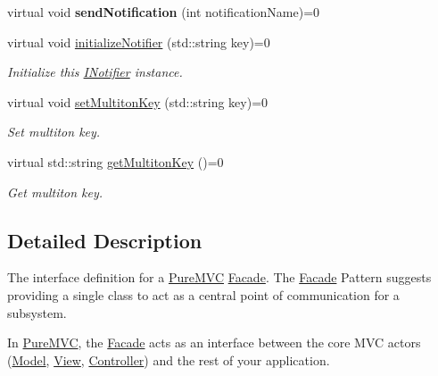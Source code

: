 \begin{DoxyCompactItemize}
\item 
\hypertarget{class_pure_m_v_c_1_1_i_notifier_aca921608a2ced017a8face049fc7c6af}{
virtual void {\bfseries sendNotification} (int notificationName)=0}
\label{class_pure_m_v_c_1_1_i_notifier_aca921608a2ced017a8face049fc7c6af}

\item 
virtual void \hyperlink{class_pure_m_v_c_1_1_i_notifier_a28d7dbbe0726d4d52080546c5d79b232}{initializeNotifier} (std::string key)=0
\begin{DoxyCompactList}\small\item\em Initialize this \hyperlink{class_pure_m_v_c_1_1_i_notifier}{INotifier} instance. \item\end{DoxyCompactList}\item 
virtual void \hyperlink{class_pure_m_v_c_1_1_i_multiton_key_heir_a03acb75ab79defba2c28b8de1bbe1ca6}{setMultitonKey} (std::string key)=0
\begin{DoxyCompactList}\small\item\em Set multiton key. \item\end{DoxyCompactList}\item 
virtual std::string \hyperlink{class_pure_m_v_c_1_1_i_multiton_key_heir_aecccfb9898368c6377550ceae5730934}{getMultitonKey} ()=0
\begin{DoxyCompactList}\small\item\em Get multiton key. \item\end{DoxyCompactList}\end{DoxyCompactItemize}


\subsection{Detailed Description}
The interface definition for a \hyperlink{namespace_pure_m_v_c}{PureMVC} \hyperlink{class_pure_m_v_c_1_1_facade}{Facade}. The \hyperlink{class_pure_m_v_c_1_1_facade}{Facade} Pattern suggests providing a single class to act as a central point of communication for a subsystem. 

In \hyperlink{namespace_pure_m_v_c}{PureMVC}, the \hyperlink{class_pure_m_v_c_1_1_facade}{Facade} acts as an interface between the core MVC actors (\hyperlink{class_pure_m_v_c_1_1_model}{Model}, \hyperlink{class_pure_m_v_c_1_1_view}{View}, \hyperlink{class_pure_m_v_c_1_1_controller}{Controller}) and the rest of your application.

